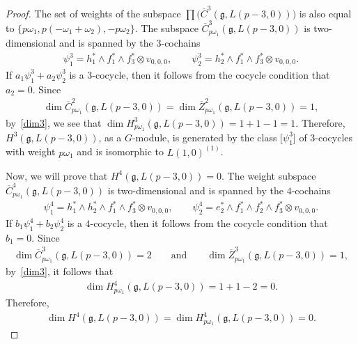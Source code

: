 \documentclass[pdftex]{sigma}%
\numberwithin{equation}{section}
\begin{document}
\begin{proof}
The set of weights of the subspace $\prod\big(\overline{C}^3(\mathfrak{g},L(p-3,0))\big)$ is also equal to $\{p\omega_1,p(-\omega_1+\omega_2),\allowbreak -p\omega_2\}$. The subspace
$\overline{C}^3_{p\omega_1}(\mathfrak{g},L(p-3,0))$ is two-dimensional and is spanned by the $3$-cochains
\begin{gather*}
\psi^3_1=h_1^*\wedge f_1^*\wedge f_3^*\otimes v_{0,0,0},\qquad\psi^3_2=h_2^*\wedge f_1^*\wedge f_3^*\otimes v_{0,0,0}.
\end{gather*}
If $a_1\psi^3_1+a_2\psi^3_2$ is a $3$-cocycle, then it follows from the cocycle condition that $a_2=0$. Since
\begin{gather*}
\dim \overline{C}^2_{p\omega_1}(\mathfrak{g},L(p-3,0))=\dim \overline{Z}^2_{p\omega_1}(\mathfrak{g},L(p-3,0))=1,
\end{gather*}
by~\eqref{dim3}, we see that $\dim H^3_{p\omega_1}(\mathfrak{g},L(p-3,0))=1+1-1=1$. Therefore, $H^3(\mathfrak{g},L(p-3,0))$, as a $G$-module, is generated by the class $\big[\psi^3_1\big]$ of $3$-cocycles with weight $p\omega_1$ and is isomorphic to $L(1,0)^{(1)}$.

 Now, we will prove that $H^4(\mathfrak{g},L(p-3,0))=0$. The weight subspace
$\overline{C}^4_{p\omega_1}(\mathfrak{g},L(p-3,0))$ is two-dimensional and is spanned by the $4$-cochains
\begin{gather*}
\psi^4_1=h_1^*\wedge h_2^*\wedge f_1^*\wedge f_3^*\otimes v_{0,0,0},\qquad\psi^4_2=e_2^*\wedge f_1^*\wedge f_2^*\wedge f_3^*\otimes v_{0,0,0}.
\end{gather*}
If $b_1\psi^4_1+b_2\psi^4_2$
is a $4$-cocycle, then it follows from the cocycle condition that $b_1=0$. Since
\begin{gather*}
\dim \overline{C}^3_{p\omega_1}(\mathfrak{g},L(p-3,0))=2\qquad\text{and}\qquad
\dim \overline{Z}^3_{p\omega_1}(\mathfrak{g},L(p-3,0))=1,
\end{gather*}
by~\eqref{dim3}, it follows that
\begin{gather*}
\dim H^4_{p\omega_1}(\mathfrak{g},L(p-3,0))=1+1-2=0.
\end{gather*}
Therefore,
\begin{gather*}
\dim H^4(\mathfrak{g},L(p-3,0))=\dim H^4_{p\omega_1}(\mathfrak{g},L(p-3,0))=0.
\end{gather*}


\end{proof}
\end{document}
